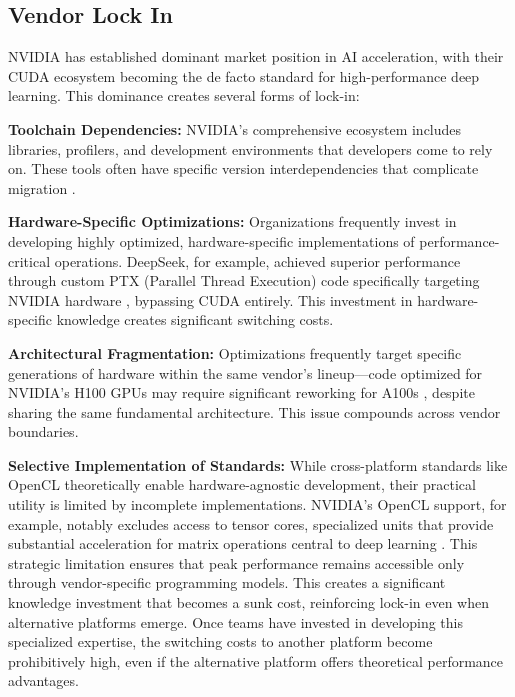 \documentclass[manuscript,screen,review,format=acmsmall]{acmart}
\begin{document}
\subsection{Vendor Lock In}

NVIDIA has established dominant market position in AI acceleration, with their CUDA ecosystem becoming the de facto standard for high-performance deep learning. This dominance creates several forms of lock-in:

\textbf{Toolchain Dependencies:} NVIDIA's comprehensive ecosystem includes libraries, profilers, and development environments that developers come to rely on\cite{Modular3}. These tools often have specific version interdependencies that complicate migration \cite{Modular4}.

\textbf{Hardware-Specific Optimizations:} Organizations frequently invest in developing highly optimized, hardware-specific implementations of performance-critical operations. DeepSeek, for example, achieved superior performance through custom PTX (Parallel Thread Execution) code specifically targeting NVIDIA hardware \cite{deepseekai2024deepseekv3technicalreport}, bypassing CUDA entirely. This investment in hardware-specific knowledge creates significant switching costs.

\textbf{Architectural Fragmentation:} Optimizations frequently target specific generations of hardware within the same vendor's lineup—code optimized for NVIDIA's H100 GPUs may require significant reworking for A100s \cite{ShahJay2024FFaA}, despite sharing the same fundamental architecture. This issue compounds across vendor boundaries.

\textbf{Selective Implementation of Standards:} While cross-platform standards like OpenCL theoretically enable hardware-agnostic development, their practical utility is limited by incomplete implementations. NVIDIA's OpenCL support, for example, notably excludes access to tensor cores\cite{Modular5}, specialized units that provide substantial acceleration for matrix operations central to deep learning \cite{MarkidisStefano2018NTCP}. This strategic limitation ensures that peak performance remains accessible only through vendor-specific programming models. This creates a significant knowledge investment that becomes a sunk cost, reinforcing lock-in even when alternative platforms emerge. Once teams have invested in developing this specialized expertise, the switching costs to another platform become prohibitively high, even if the alternative platform offers theoretical performance advantages.
\end{document}

